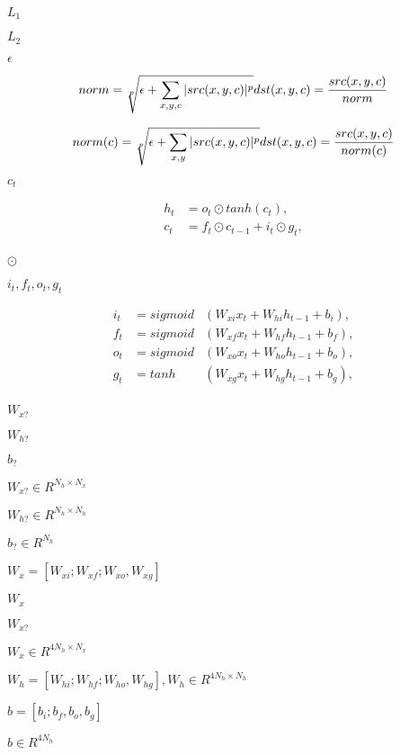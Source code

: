 \documentclass{article}
\begin{document}
$ L_1 $
\pagebreak

$ L_2 $
\pagebreak

$ \epsilon $
\pagebreak

\[ norm = \sqrt[p]{\epsilon + \sum_{x, y, c} |src(x, y, c)|^p } \\ dst(x, y, c) = \frac{ src(x, y, c) }{norm} \]
\pagebreak

\[ norm(c) = \sqrt[p]{\epsilon + \sum_{x, y} |src(x, y, c)|^p } \\ dst(x, y, c) = \frac{ src(x, y, c) }{norm(c)} \]
\pagebreak

$c_t$
\pagebreak

\begin{eqnarray*} h_t &= o_t \odot tanh(c_t), \\ c_t &= f_t \odot c_{t-1} + i_t \odot g_t, \\ \end{eqnarray*}
\pagebreak

$\odot$
\pagebreak

$i_t, f_t, o_t, g_t$
\pagebreak

\begin{eqnarray*} i_t &= sigmoid&(W_{xi} x_t + W_{hi} h_{t-1} + b_i), \\ f_t &= sigmoid&(W_{xf} x_t + W_{hf} h_{t-1} + b_f), \\ o_t &= sigmoid&(W_{xo} x_t + W_{ho} h_{t-1} + b_o), \\ g_t &= tanh &(W_{xg} x_t + W_{hg} h_{t-1} + b_g), \\ \end{eqnarray*}
\pagebreak

$W_{x?}$
\pagebreak

$W_{h?}$
\pagebreak

$b_{?}$
\pagebreak

$W_{x?} \in R^{N_h \times N_x}$
\pagebreak

$W_{h?} \in R^{N_h \times N_h}$
\pagebreak

$b_? \in R^{N_h}$
\pagebreak

$ W_x = [W_{xi}; W_{xf}; W_{xo}, W_{xg}] $
\pagebreak

$W_x$
\pagebreak

$ W_{x?} $
\pagebreak

$ W_x \in R^{4N_h \times N_x} $
\pagebreak

$ W_h = [W_{hi}; W_{hf}; W_{ho}, W_{hg}], W_h \in R^{4N_h \times N_h} $
\pagebreak

$ b = [b_i; b_f, b_o, b_g]$
\pagebreak

$b \in R^{4N_h} $
\pagebreak
\end{document}
